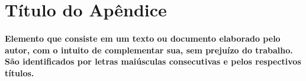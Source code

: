 \section{Título do Apêndice} \label{ap:defesa}

\paragraph{Elemento que consiste em um texto ou documento elaborado pelo autor, com o intuito de complementar sua, sem prejuízo do trabalho. São identificados por letras maiúsculas consecutivas e pelos respectivos títulos.}